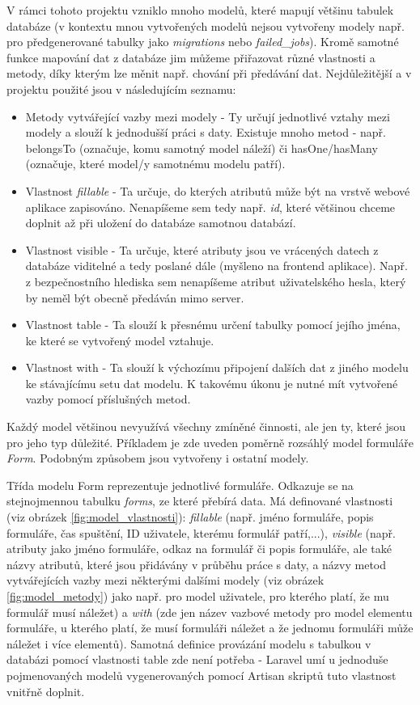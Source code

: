 	V rámci tohoto projektu vzniklo mnoho modelů, které mapují většinu tabulek databáze (v kontextu mnou vytvořených modelů nejsou vytvořeny modely např. pro předgenerované tabulky jako \textit{migrations} nebo \textit{failed\_jobs}). Kromě samotné funkce mapování dat z databáze jim můžeme přiřazovat různé vlastnosti a metody, díky kterým lze měnit např. chování při předávání dat. Nejdůležitější a v projektu použité jsou v následujícím seznamu:
	
	\begin{itemize}
		\item Metody vytvářející vazby mezi modely - Ty určují jednotlivé vztahy mezi modely a slouží k jednodušší práci s daty. Existuje mnoho metod - např. belongsTo (označuje, komu samotný model náleží) či hasOne/hasMany (označuje, které model/y samotnému modelu patří). \cite{LaravelORM}
		\item Vlastnost \textit{fillable} - Ta určuje, do kterých atributů může být na vrstvě webové aplikace zapisováno. Nenapíšeme sem tedy např. \textit{id}, které většinou chceme doplnit až při uložení do databáze samotnou databází. \cite{LaravelORM}
		\item Vlastnost visible - Ta určuje, které atributy jsou ve vrácených datech z databáze viditelné a tedy poslané dále (myšleno na frontend aplikace). Např. z bezpečnostního hlediska sem nenapíšeme atribut uživatelského hesla, který by neměl být obecně předáván mimo server. \cite{LaravelORM}
		\item Vlastnost table - Ta slouží k přesnému určení tabulky pomocí jejího jména, ke které se vytvořený model vztahuje. \cite{LaravelORM}
		\item Vlastnost with - Ta slouží k výchozímu připojení dalších dat z jiného modelu ke stávajícímu setu dat modelu. K takovému úkonu je nutné mít vytvořené vazby pomocí příslušných metod. \cite{LaravelORM}
	\end{itemize}

	Každý model většinou nevyužívá všechny zmíněné činnosti, ale jen ty, které jsou pro jeho typ důležité. Příkladem je zde uveden poměrně rozsáhlý model formuláře \textit{Form}. Podobným způsobem jsou vytvořeny i ostatní modely.
	
	Třída modelu Form reprezentuje jednotlivé formuláře. Odkazuje se na stejnojmennou tabulku \textit{forms}, ze které přebírá data. Má definované vlastnosti (viz obrázek \ref{fig:model_vlastnosti}): \textit{fillable} (např. jméno formuláře, popis formuláře, čas spuštění, ID uživatele, kterému formulář patří,...), \textit{visible} (např. atributy jako jméno formuláře, odkaz na formulář či popis formuláře, ale také názvy atributů, které jsou přidávány v průběhu práce s daty, a názvy metod vytvářejících vazby mezi některými dalšími modely (viz obrázek \ref{fig:model_metody}) jako např. pro model uživatele, pro kterého platí, že mu formulář musí náležet) a \textit{with} (zde jen název vazbové metody pro model elementu formuláře, u kterého platí, že musí formuláři náležet a že jednomu formuláři může náležet i více elementů). Samotná definice provázání modelu s tabulkou v databázi pomocí vlastnosti table zde není potřeba - Laravel umí u jednoduše pojmenovaných modelů vygenerovaných pomocí Artisan skriptů tuto vlastnost vnitřně doplnit.
	
